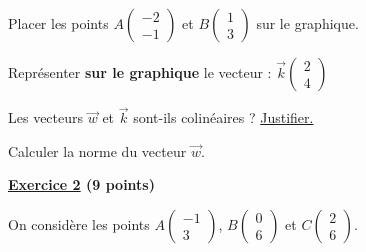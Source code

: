\documentclass[12pt,a4paper]{exam}
\newcommand*{\Coord}[2]{%
  \ensuremath{
    \begin{pmatrix} 
      #1\\[5pt]
      #2 
    \end{pmatrix}}}
\begin{document}
\vspace{5pt}
\begin{questions}

\question[0,5] Placer les points $A\Coord{-2}{-1}$ et $B\Coord{1}{3}$ sur le graphique.

\vspace{10pt}

\question
{}

\question[1] Représenter \textbf{sur le graphique} le vecteur : $\overrightarrow{k}\Coord{2}{4}$

\question[2] Les vecteurs $\overrightarrow{w}$ et $\overrightarrow{k}$ sont-ils colinéaires ? 
\underline{Justifier.}

\question[1] Calculer la norme du vecteur $\overrightarrow{w}$.



\end{questions}

\vspace{1cm}


\textbf{\underline{Exercice 2} (9 points)}

On considère les points $A\Coord{-1}{3}$, $B\Coord{0}{6}$ et $C\Coord{2}{6}$.
\end{document}
